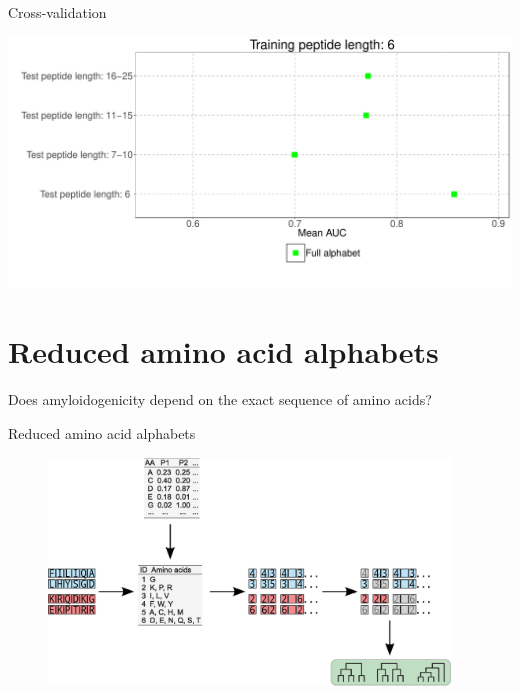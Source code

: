 \documentclass{beamer}\usepackage[]{graphicx}\usepackage[]{color}
\makeatletter
\def\maxwidth{ %
  \ifdim\Gin@nat@width>\linewidth
    \linewidth
  \else
    \Gin@nat@width
  \fi
}
\newenvironment{knitrout}{}{} %
\makeatother
\begin{document}
\begin{frame}{Cross-validation}
\begin{knitrout}
\color{fgcolor}

{\centering \includegraphics[width=\maxwidth]{figure/unnamed-chunk-1-1} 

}



\end{knitrout}
\end{frame}

\section{Reduced amino acid alphabets}
  
\begin{frame}
  Does amyloidogenicity depend on the exact sequence of amino acids?
  \end{frame}
  
    \begin{frame}{Reduced amino acid alphabets}
\begin{figure} 
\includegraphics[width=0.95\textwidth]{static_figure/ngram2.eps}
\end{figure}
  \end{frame}
\end{document}
